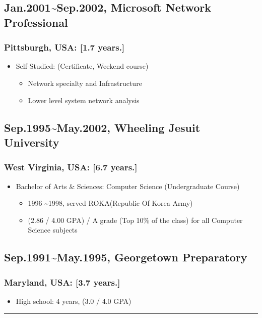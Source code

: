 \documentclass[12pt,a4paper]{article}
\begin{document}
\subsection{Jan.2001{\textasciitilde}Sep.2002, Microsoft Network Professional}
\subsubsection{Pittsburgh, USA: [1.7 years.]}
\begin{itemize}
\item Self-Studied: (Certificate, Weekend course)

\begin{itemize}
\item Network specialty and Infrastructure


\item Lower level system network analysis

\end{itemize}
\end{itemize}
\subsection{Sep.1995{\textasciitilde}May.2002, Wheeling Jesuit University}
\subsubsection{West Virginia, USA: [6.7 years.]}
\begin{itemize}
\item Bachelor of Arts \& Sciences: Computer Science (Undergraduate Course)

\begin{itemize}
\item 1996 {\textasciitilde}1998, served ROKA(Republic Of Korea Army) 


\item (2.86 / 4.00 GPA) / A grade (Top 10\% of the class) for all Computer Science subjects

\end{itemize}
\end{itemize}
\subsection{Sep.1991{\textasciitilde}May.1995, Georgetown Preparatory}
\subsubsection{Maryland, USA: [3.7 years.]}
\begin{itemize}
\item High school: 4 years, (3.0 / 4.0 GPA)

\end{itemize}
\rule{\textwidth}{1pt}
\end{document}
